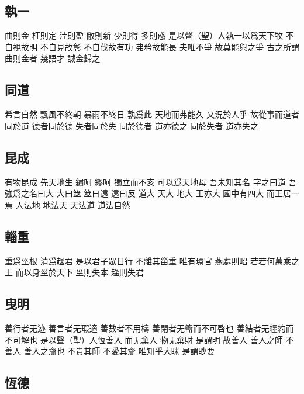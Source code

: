 \documentclass[a5paper,zihao=-4,oneside,UTF8]{ctexart}
\begin{document}
\subsection{執一}



曲則金 枉則定 
洼則盈 敝則新 少則得 多則惑 
是以聲（聖）人執一以爲天下牧 
不自視故明 不自見故彰 不自伐故有功 弗矜故能長 
夫唯不爭 故莫能與之爭 
古之所謂曲則金者 幾語才 誠金歸之 



\subsection{同道}



希言自然 
飄風不終朝 暴雨不終日 
孰爲此 天地而弗能久 又況於人乎 
故從事而道者同於道 德者同於德 失者同於失 
同於德者 道亦德之 同於失者 道亦失之 



\subsection{昆成}



有物昆成 先天地生 
繡呵 繆呵 獨立而不亥 可以爲天地母 
吾未知其名 字之曰道 吾強爲之名曰大 
大曰筮 筮曰遠 遠曰反 
道大 天大 地大 王亦大 
國中有四大 而王居一焉 
人法地 地法天 天法道 道法自然 




\subsection{輜重}



重爲巠根 清爲趮君 
是以君子眾日行 不離其甾重 
唯有環官 燕處則昭 
若若何萬乘之王 而以身巠於天下 
巠則失本 趮則失君 



\subsection{曳明}



善行者无迹 善言者无瑕適 善數者不用檮 善閉者无籥而不可啓也 善結者无纆約而不可解也 
是以聲（聖）人恆善人 而无棄人 物无棄財 是謂明 
故善人 善人之師 不善人 善人之齎也 
不貴其師 不愛其齎 唯知乎大眯 是謂眇要 



\subsection{恆德}
\end{document}
